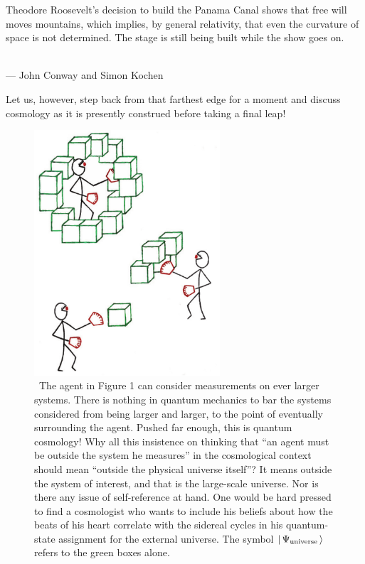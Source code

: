 \documentclass[aps,pra,superscriptaddress,12pt,tightenlines,nofootinbib]{revtex4-2}
\begin{document}
\begin{flushright}
\baselineskip=13pt
\parbox{2.8in}{\baselineskip=13pt
\small Theodore Roosevelt's decision to build the Panama Canal shows that free will
moves mountains, which implies, by general relativity, that even the
curvature of space is not determined. The stage is still being built while
the show goes on.}
\medskip\\
\small --- John Conway and Simon Kochen~\cite{Conway06}
\end{flushright}

Let us, however, step back from that farthest edge for a moment and discuss cosmology as it is presently construed before taking a final leap!

\begin{figure}
\begin{center}
\includegraphics[height=3.6in]{cosmology}
\bigskip\caption{~The agent in Figure 1 can consider measurements on ever larger systems. There is nothing in quantum mechanics to bar the systems considered from being larger and larger, to the point of eventually surrounding the agent.  Pushed far enough, this is quantum cosmology!  Why all this insistence on thinking that ``an agent must be outside the system he measures'' in the cosmological context should mean ``outside the physical universe itself''?  It means outside the system of interest, and that is the large-scale universe. Nor is there any issue of self-reference at hand.  One would be hard pressed to find a cosmologist who wants to include his beliefs about how the beats of his heart correlate with the sidereal cycles in his quantum-state assignment for the external universe.  The symbol $|\,\Psi_{\rm  universe}\,\rangle$ refers to the green boxes alone.}
\end{center}
\end{figure}
\end{document}
